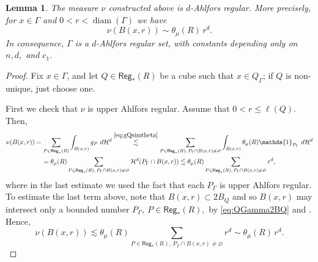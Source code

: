 \documentclass[11pt,reqno]{amsart}
\def\one{\mathds{1}}
\DeclareMathOperator{\diam}{diam}
\newtheorem{lemma}[theorem]{Lemma}
\theoremstyle{definition}
\theoremstyle{remark}
\numberwithin{equation}{section}
\newcommand{\hd}{\mathcal{H}^d}
\newcommand{\Reg}{\mathsf{Reg}_*}
\theoremstyle{theorem}
\theoremstyle{definition}
\theoremstyle{remark}
\numberwithin{equation}{section}
\begin{document}
	\begin{lemma}\label{lem:GammaADR}
		The measure $\nu$ constructed above is $d$-Ahlfors regular. More precisely, for $x\in\Gamma$ and $0<r<\diam(\Gamma)$ we have
		\begin{equation}\label{eq:nuADR}
		\nu(B(x,r))\sim \theta_\mu(R)\, r^d.
		\end{equation}
		In consequence, $\Gamma$ is a $d$-Ahlfors regular set, with constants depending only on $n,d,$ and $c_1$.%
	\end{lemma}
	\begin{proof}
		Fix $x\in\Gamma$, and let $Q\in\Reg(R)$ be a cube such that $x\in Q_\Gamma$; if $Q$ is non-unique, just choose one.
		
		First we check that $\nu$ is upper Ahlfors regular. Assume that $0<r\le \ell(Q)$. Then, 
		\begin{multline*}
		\nu(B(x,r)) = \sum_{P\in\Reg(R)}\int_{B(x,r)} g_P\ d\hd\overset{\eqref{eq:gQsimtheta}}{\lesssim} \sum_{P\in\Reg(R),\, P_{\Gamma}\cap B(x,r)\neq\varnothing} \int_{B(x,r)}\theta_\mu(R)\one_{P_\Gamma}\ d\hd\\
		 = \theta_\mu(R)\sum_{P\in\Reg(R),\, P_{\Gamma}\cap B(x,r)\neq\varnothing} \hd({P_\Gamma\cap B(x,r)})\lesssim \theta_\mu(R)\sum_{P\in\Reg(R),\, P_{\Gamma}\cap B(x,r)\neq\varnothing} r^d,
		\end{multline*}
		where in the last estimate we used the fact that each $P_\Gamma$ is upper Ahlfors regular. To estimate the last term above, note that $B(x,r)\subset 2B_Q$ and so $B(x,r)$ may intersect only a bounded number $P_\Gamma,\ P\in\Reg(R),$ by \eqref{eq:QGamma2BQ} and . Hence,
		\begin{equation*}
		\nu(B(x,r)) \lesssim \theta_\mu(R)\sum_{P\in\Reg(R),\, P_{\Gamma}\cap B(x,r)\neq\varnothing} r^d \sim \theta_\mu(R)\, r^d.
		\end{equation*}
		

\end{proof}
\end{document}

